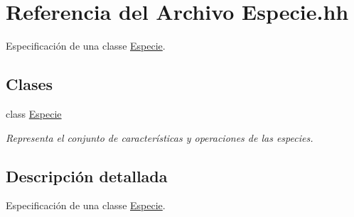 \hypertarget{_especie_8hh}{}\section{Referencia del Archivo Especie.\+hh}
\label{_especie_8hh}


Especificación de una classe \hyperlink{class_especie}{Especie}.  


\subsection*{Clases}
\begin{DoxyCompactItemize}
\item 
class \hyperlink{class_especie}{Especie}
\begin{DoxyCompactList}\small\item\em Representa el conjunto de características y operaciones de las especies. \end{DoxyCompactList}\end{DoxyCompactItemize}


\subsection{Descripción detallada}
Especificación de una classe \hyperlink{class_especie}{Especie}. 

